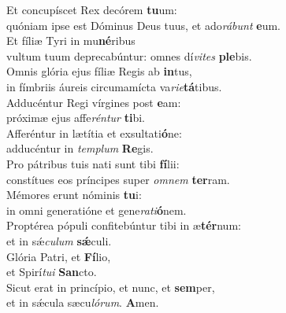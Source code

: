 \oddverse Et concupíscet Rex decórem \textbf{tu}um:~\*\\
\oddverse quóniam ipse est Dóminus Deus tuus, et ado\textit{rá}\textit{bunt} \textbf{e}um.\\
\evenverse Et fíliæ Tyri in mu\textbf{né}ribus~\*\\
\evenverse vultum tuum deprecabúntur: omnes dí\textit{vi}\textit{tes} \textbf{ple}bis.\\
\oddverse Omnis glória ejus fíliæ Regis ab \textbf{in}tus,~\*\\
\oddverse in fímbriis áureis circumamícta va\textit{ri}\textit{e}\textbf{tá}tibus.\\
\evenverse Adducéntur Regi vírgines post \textbf{e}am:~\*\\
\evenverse próximæ ejus affe\textit{rén}\textit{tur} \textbf{ti}bi.\\
\oddverse Afferéntur in lætítia et exsultati\textbf{ó}ne:~\*\\
\oddverse adducéntur in \textit{tem}\textit{plum} \textbf{Re}gis.\\
\evenverse Pro pátribus tuis nati sunt tibi \textbf{fí}lii:~\*\\
\evenverse constítues eos príncipes super \textit{om}\textit{nem} \textbf{ter}ram.\\
\oddverse Mémores erunt nóminis \textbf{tu}i:~\*\\
\oddverse in omni generatióne et gene\textit{ra}\textit{ti}\textbf{ó}nem.\\
\evenverse Proptérea pópuli confitebúntur tibi in æ\textbf{tér}num:~\*\\
\evenverse et in sǽ\textit{cu}\textit{lum} \textbf{sǽ}culi.\\
\oddverse Glória Patri, et \textbf{Fí}lio,~\*\\
\oddverse et Spirí\textit{tu}\textit{i} \textbf{San}cto.\\
\evenverse Sicut erat in princípio, et nunc, et \textbf{sem}per,~\*\\
\evenverse et in sǽcula sæcu\textit{ló}\textit{rum}. \textbf{A}men.\\
